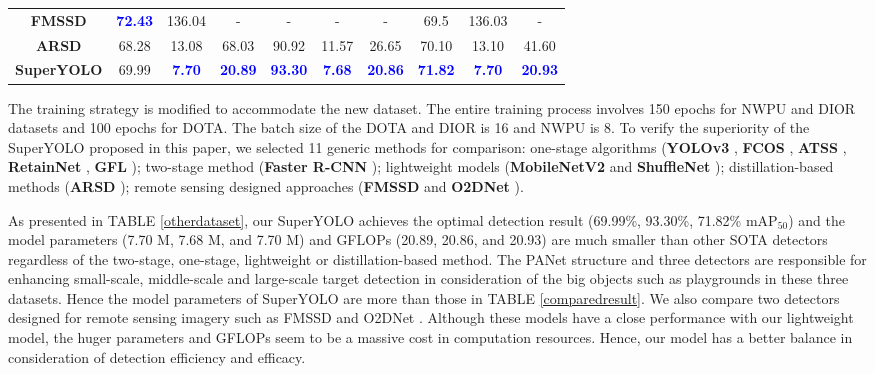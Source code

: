 \begin{table*}[htpb]
{\begin{tabular}{c|ccc|ccc|ccc}
			\textbf{FMSSD \cite{2020FMSSD}}     & \textbf{\textcolor{blue}{72.43}}         &     136.04     & -         & -                & -          & -          & 69.5     & 136.03          & -        \\
			\textbf{ARSD \cite{yang2022adaptive}}         & 68.28 & 13.08     & 68.03    & 90.92 & 11.57     & 26.65    & 70.10 & 13.10     & 41.60           \\
			\textbf{SuperYOLO} & 69.99 & \textbf{\textcolor{blue}{7.70}} & \textbf{\textcolor{blue}{20.89} }& \textbf{\textcolor{blue}{93.30}}   & \textbf{\textcolor{blue}{7.68}} & \textbf{\textcolor{blue}{20.86} }&  \textbf{\textcolor{blue}{71.82}} & \textbf{\textcolor{blue}{7.70}} & \textbf{\textcolor{blue}{20.93}} \\
\bottomrule[1.2pt]
	\end{tabular}}
	\vspace{-0.1in}
\end{table*} 
The training strategy is modified to accommodate the new dataset. The entire training process involves 150 epochs for NWPU and DIOR datasets and 100 epochs for DOTA. The batch size of the DOTA and DIOR is 16 and NWPU is 8. To verify the superiority of the SuperYOLO proposed in this paper, we selected 11 generic methods for comparison: one-stage algorithms (\textbf{YOLOv3} \cite{redmon2018yolov3},  \textbf{FCOS} \cite{tian2019fcos},  \textbf{ATSS} \cite{zhang2020bridging}, \textbf{RetainNet} \cite{lin2017focal}, \textbf{GFL} \cite{li2020generalized}); two-stage method (\textbf{Faster R-CNN} \cite{ren2016faster}); lightweight models (\textbf{MobileNetV2} \cite{sandler2018mobilenetv2} and \textbf{ShuffleNet} \cite{zhang2018shufflenet}); distillation-based methods (\textbf{ARSD} \cite{yang2022adaptive}); remote sensing designed approaches (\textbf{FMSSD} \cite{2020FMSSD} and \textbf{O2DNet} \cite{WEI2020268}).

As presented in TABLE \ref{otherdataset}, our SuperYOLO achieves the optimal detection result (69.99\%, 93.30\%, 71.82\% $\text{mA}{{\text{P}}_{\text{50}}}$) and the model parameters (7.70 M, 7.68 M, and 7.70 M) and GFLOPs (20.89, 20.86, and 20.93) are much smaller than other SOTA detectors regardless of the two-stage, one-stage, lightweight or distillation-based method. The PANet structure and three detectors are responsible for enhancing small-scale, middle-scale and large-scale target detection in consideration of the big objects such as playgrounds in these three datasets. Hence the model parameters of SuperYOLO are more than those in TABLE \ref{comparedresult}. We also compare two detectors designed for remote sensing imagery such as FMSSD \cite{2020FMSSD} and O2DNet \cite{WEI2020268}. Although these models have a close performance with our lightweight model, the huger parameters and GFLOPs seem to be a massive cost in computation resources. Hence, our model has a better balance in consideration of detection efficiency and efficacy.



